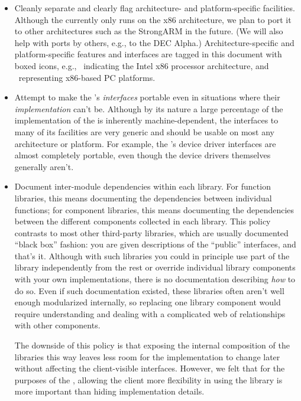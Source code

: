 \begin{itemize}
\item	Cleanly separate and clearly flag
	architecture- and platform-specific facilities.
	Although the \oskit{} currently only runs on the x86 architecture,
	we plan to port it to other architectures
	such as the StrongARM in the future.
	(We will also help with ports by others, e.g., to the DEC Alpha.)
	Architecture-specific and platform-specific features and interfaces
	are tagged in this document with boxed icons,
	e.g., \intel\ indicating the Intel x86 processor architecture,
	and \intelpc\ representing x86-based PC platforms.

\item	Attempt to make the \oskit's \emph{interfaces} portable
	even in situations where their \emph{implementation} can't be.
	Although by its nature a large percentage
	of the implementation of the \oskit{}
	is inherently machine-dependent,
	the interfaces to many of its facilities are very generic
	and should be usable on most any architecture or platform.
	For example, the \oskit's device driver interfaces
	are almost completely portable,
	even though the device drivers themselves generally aren't.

\item	Document inter-module dependencies within each library.
	For function libraries,
	this means documenting the dependencies between individual functions;
	for component libraries,
	this means documenting the dependencies
	between the different components collected in each library.
	This policy contrasts to most other third-party libraries,
	which are usually documented ``black box'' fashion:
	you are given descriptions of the ``public'' interfaces, and that's it.
	Although with such libraries
	you could in principle
	use part of the library independently from the rest
	or override individual library components
	with your own implementations,
	there is no documentation describing \emph{how} to do so.
	Even if such documentation existed,
	these libraries often aren't well enough modularized internally,
	so replacing one library component would require
	understanding and dealing with a complicated web
	of relationships with other components.

	The downside of this policy is that
	exposing the internal composition of the libraries this way
	leaves less room for the implementation to change later
	without affecting the client-visible interfaces.
	However, we felt that for the purposes of the \oskit{},
	allowing the client more flexibility in using the library
	is more important than hiding implementation details.


\end{itemize}
